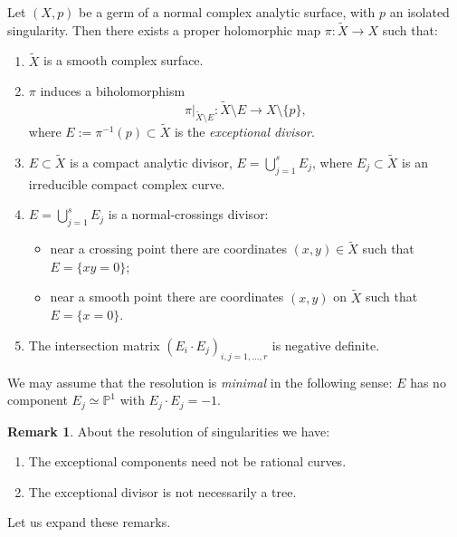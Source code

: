 \documentclass[11pt,twoside]{amsart}
\newcommand{\Pone}{\mathbb P^1}
\theoremstyle{definition}
\newtheorem{remark}{Remark}
\begin{document}
Let $(X,p)$ be a germ of a normal complex analytic surface, with $p$ an isolated singularity. Then there exists a proper holomorphic map $\pi\colon\widetilde X\to X$ such that:
\begin{enumerate}
\item[(i)] $\widetilde X$ is a smooth complex surface.
\item[(ii)] $\pi$ induces a biholomorphism
\[
\pi\big|_{\widetilde X\setminus E}\colon\widetilde X\setminus E
\to X\setminus\{p\},
\]
where $E:=\pi^{-1}(p)\subset \widetilde X$
is the \textit{exceptional divisor}.

\item[(iii)] $E\subset \widetilde X$ is a compact analytic divisor, $E=\displaystyle\bigcup_{j=1}^{s}E_j$, where $E_j\subset\widetilde X$ is an irreducible compact complex curve.

\item[(iv)] $E=\displaystyle\bigcup_{j=1}^{s}E_j$ is a normal-crossings divisor:
\begin{itemize}
\item near a crossing point there are coordinates $(x,y)\in\widetilde X$ such that $E=\{xy=0\}$;
\item near a smooth point there are coordinates $(x,y)$ on $\widetilde X$ such that
$E=\{x=0\}$.
\end{itemize}

\item[(v)] The intersection matrix
$(E_i\cdot E_j)_{i,j=1,\ldots,r}$
is negative definite.
\end{enumerate}

We may assume that the resolution is \textit{minimal} in the following sense: $E$ has no component $E_j\simeq \Pone$ with $E_j\cdot E_j=-1$.

\begin{remark}About the resolution of singularities we have:
\begin{enumerate}
\item[(a)] The exceptional components need not be rational curves.

\item[(b)] The exceptional divisor is not necessarily a tree.
\end{enumerate}
\end{remark}

Let us expand these remarks.
\end{document}
